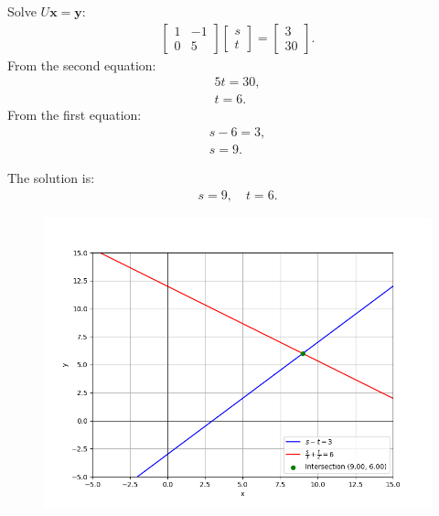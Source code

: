 \documentclass[journal]{IEEEtran}
\begin{document}
Solve \(U\mathbf{x} = \mathbf{y}\):
\begin{align}
    \begin{bmatrix} 1 & -1 \\ 0 & 5 \end{bmatrix} \begin{bmatrix} s \\ t \end{bmatrix} = \begin{bmatrix} 3 \\ 30 \end{bmatrix}.
\end{align}
From the second equation:
\begin{align}
    5t = 30, \\
    t = 6.
\end{align}
From the first equation:
\begin{align}
    s - 6 = 3, \\
    s = 9.
\end{align}

The solution is:
\begin{align}
    s = 9, \quad t = 6.
\end{align}

 \begin{figure}[h!]
	\centering
	\includegraphics[width=\columnwidth]{figures/Figure_1.png}
	\label{stemplot}
\end{figure}
\end{document}

